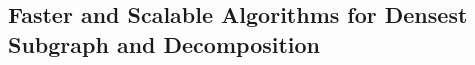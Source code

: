 \documentclass[../../main/main.tex]{subfiles}
\begin{document}
\subsection*{Faster and Scalable Algorithms for Densest Subgraph and Decomposition}

~\cite{harb22-00}

\bibsub
\end{document}
